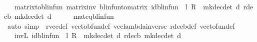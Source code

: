 \begin{isabellebody}
\ \ \isamarkupfalse%
\ \isamarkupfalse%
\ {\isachardoublequoteopen}{\isasymdots}\ {\isacharequal}{\kern0pt}\ matrix{\isacharunderscore}{\kern0pt}to{\isacharunderscore}{\kern0pt}blinfun\ {\isacharparenleft}{\kern0pt}matrix{\isacharunderscore}{\kern0pt}inv\ {\isacharparenleft}{\kern0pt}blinfun{\isacharunderscore}{\kern0pt}to{\isacharunderscore}{\kern0pt}matrix\ {\isacharparenleft}{\kern0pt}id{\isacharunderscore}{\kern0pt}blinfun\ {\isacharminus}{\kern0pt}\ l\ {\isacharasterisk}{\kern0pt}\isactrlsub R\ {\isasymP}\ {\isacharparenleft}{\kern0pt}mk{\isacharunderscore}{\kern0pt}dec{\isacharunderscore}{\kern0pt}det\ {\isacharquery}{\kern0pt}d{\isacharparenright}{\kern0pt}{\isacharparenright}{\kern0pt}{\isacharparenright}{\kern0pt}{\isacharparenright}{\kern0pt}\ {\isacharparenleft}{\kern0pt}r{\isacharunderscore}{\kern0pt}dec\isactrlsub b\ {\isacharparenleft}{\kern0pt}mk{\isacharunderscore}{\kern0pt}dec{\isacharunderscore}{\kern0pt}det\ {\isacharquery}{\kern0pt}d{\isacharparenright}{\kern0pt}{\isacharparenright}{\kern0pt}{\isachardoublequoteclose}\isanewline
\ \ \ \ \isamarkupfalse%
\ mat{\isacharunderscore}{\kern0pt}eq{\isacharunderscore}{\kern0pt}blinfun\isanewline
\ \ \ \ \isamarkupfalse%
\ {\isacharparenleft}{\kern0pt}auto\ simp{\isacharcolon}{\kern0pt}\ \ r{\isacharunderscore}{\kern0pt}vec{\isacharprime}{\kern0pt}{\isacharunderscore}{\kern0pt}def\ vec{\isacharunderscore}{\kern0pt}to{\isacharunderscore}{\kern0pt}bfun{\isacharunderscore}{\kern0pt}def\ vec{\isacharunderscore}{\kern0pt}lambda{\isacharunderscore}{\kern0pt}inverse\ r{\isacharunderscore}{\kern0pt}dec\isactrlsub b{\isacharunderscore}{\kern0pt}def\ vec{\isacharunderscore}{\kern0pt}to{\isacharunderscore}{\kern0pt}fun{\isacharunderscore}{\kern0pt}def{\isacharparenright}{\kern0pt}\isanewline
\ \ \isamarkupfalse%
\ \isamarkupfalse%
\ {\isachardoublequoteopen}{\isasymdots}\ {\isacharequal}{\kern0pt}\ inv\isactrlsub L\ {\isacharparenleft}{\kern0pt}id{\isacharunderscore}{\kern0pt}blinfun\ {\isacharminus}{\kern0pt}\ l\ {\isacharasterisk}{\kern0pt}\isactrlsub R\ {\isasymP}\ {\isacharparenleft}{\kern0pt}mk{\isacharunderscore}{\kern0pt}dec{\isacharunderscore}{\kern0pt}det\ {\isacharquery}{\kern0pt}d{\isacharparenright}{\kern0pt}{\isacharparenright}{\kern0pt}\ {\isacharparenleft}{\kern0pt}r{\isacharunderscore}{\kern0pt}dec\isactrlsub b\ {\isacharparenleft}{\kern0pt}mk{\isacharunderscore}{\kern0pt}dec{\isacharunderscore}{\kern0pt}det\ {\isacharquery}{\kern0pt}d{\isacharparenright}{\kern0pt}{\isacharparenright}{\kern0pt}{\isachardoublequoteclose}\isanewline

\end{isabellebody}
